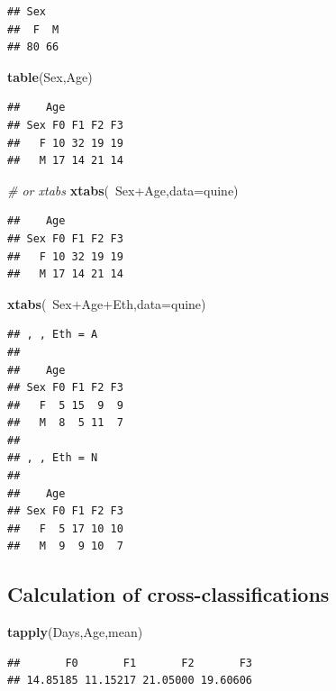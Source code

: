 \documentclass[]{article}
\newenvironment{Shaded}{\begin{snugshade}}{\end{snugshade}}
\newcommand{\KeywordTok}[1]{\textcolor[rgb]{0.13,0.29,0.53}{\textbf{{#1}}}}
\newcommand{\DataTypeTok}[1]{\textcolor[rgb]{0.13,0.29,0.53}{{#1}}}
\newcommand{\CommentTok}[1]{\textcolor[rgb]{0.56,0.35,0.01}{\textit{{#1}}}}
\newcommand{\NormalTok}[1]{{#1}}
\numberwithin{equation}{section}
\begin{document}
\begin{verbatim}
## Sex
##  F  M 
## 80 66
\end{verbatim}

\begin{Shaded}
\begin{Highlighting}[]
\KeywordTok{table}\NormalTok{(Sex,Age)}
\end{Highlighting}
\end{Shaded}

\begin{verbatim}
##    Age
## Sex F0 F1 F2 F3
##   F 10 32 19 19
##   M 17 14 21 14
\end{verbatim}

\begin{Shaded}
\begin{Highlighting}[]
\CommentTok{# or xtabs}
\KeywordTok{xtabs}\NormalTok{(~Sex+Age,}\DataTypeTok{data=}\NormalTok{quine)}
\end{Highlighting}
\end{Shaded}

\begin{verbatim}
##    Age
## Sex F0 F1 F2 F3
##   F 10 32 19 19
##   M 17 14 21 14
\end{verbatim}

\begin{Shaded}
\begin{Highlighting}[]
\KeywordTok{xtabs}\NormalTok{(~Sex+Age+Eth,}\DataTypeTok{data=}\NormalTok{quine)}
\end{Highlighting}
\end{Shaded}

\begin{verbatim}
## , , Eth = A
## 
##    Age
## Sex F0 F1 F2 F3
##   F  5 15  9  9
##   M  8  5 11  7
## 
## , , Eth = N
## 
##    Age
## Sex F0 F1 F2 F3
##   F  5 17 10 10
##   M  9  9 10  7
\end{verbatim}

\subsection{Calculation of
cross-classifications}\label{calculation-of-cross-classifications}

\begin{Shaded}
\begin{Highlighting}[]
\KeywordTok{tapply}\NormalTok{(Days,Age,mean)}
\end{Highlighting}
\end{Shaded}

\begin{verbatim}
##       F0       F1       F2       F3 
## 14.85185 11.15217 21.05000 19.60606
\end{verbatim}
\end{document}
